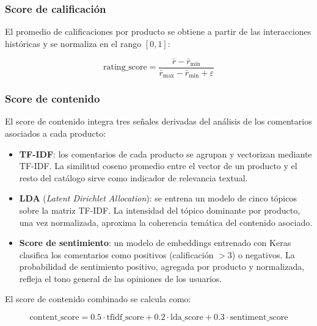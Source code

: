 \documentclass[11pt, letterpaper]{article}
\begin{document}
	\subsubsection*{Score de calificación}
	
	El promedio de calificaciones por producto se obtiene a partir de las
	interacciones históricas y se normaliza en el rango $[0, 1]$:
	
	\begin{equation}
		\text{rating\_score} = \frac{\bar{r} - \bar{r}_{\min}}{\bar{r}_{\max} - \bar{r}_{\min} + \varepsilon}
		\label{eq:rating_score}
	\end{equation}
	
	\subsubsection*{Score de contenido}
	
	El score de contenido integra tres señales derivadas del análisis de los
	comentarios asociados a cada producto:
	
	\begin{itemize}
		\item \textbf{TF-IDF}: los comentarios de cada producto se agrupan y
		vectorizan mediante TF-IDF. La similitud coseno promedio entre el vector
		de un producto y el resto del catálogo sirve como indicador de relevancia
		textual.
		
		\item \textbf{LDA} (\textit{Latent Dirichlet Allocation}): se entrena un
		modelo de cinco tópicos sobre la matriz TF-IDF. La intensidad del tópico
		dominante por producto, una vez normalizada, aproxima la coherencia
		temática del contenido asociado.
		
		\item \textbf{Score de sentimiento}: un modelo de embeddings entrenado con
		Keras clasifica los comentarios como positivos (calificación $> 3$) o
		negativos. La probabilidad de sentimiento positivo, agregada por producto
		y normalizada, refleja el tono general de las opiniones de los usuarios.
	\end{itemize}
	
	El score de contenido combinado se calcula como:
	
	\begin{equation}
		\text{content\_score} = 0.5 \cdot \text{tfidf\_score}
		+ 0.2 \cdot \text{lda\_score}
		+ 0.3 \cdot \text{sentiment\_score}
		\label{eq:content_score}
	\end{equation}
	
\end{document}
